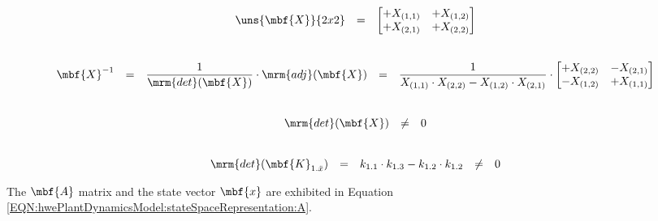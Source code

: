 \documentclass[crop=false,float=true,class=scrreprt]{standalone}
\begin{document}
\vspace*{+0em}


\begin{gather}
\label{EQN:hwePlantDynamicsModel:stateSpaceRepresentation:nonsingular:start}
\begin{array}{ccc}
\uns{
\begin{matrix}
\mbf{X}
\end{matrix}
}{2 x 2}
& = &
\begin{bmatrix}
+X_{(1,1)} & +X_{(1,2)} \\
+X_{(2,1)} & +X_{(2,2)} \\
\end{bmatrix}
\end{array}
\\[+2em]
\begin{array}{ccccccccccc}
\mbf{X}^{-1}
& = &
\displaystyle\frac{1}{\mrm{det}(\mbf{X})} \cdot \mrm{adj}(\mbf{X})
& = &
\displaystyle\frac{1}{X_{(1,1)} \cdot X_{(2,2)} - X_{(1,2)} \cdot X_{(2,1)}} 
\cdot
\begin{bmatrix}
+X_{(2,2)} & -X_{(2,1)} \\
-X_{(1,2)} & +X_{(1,1)} \\
\end{bmatrix}
\end{array}
\\[+2em]
\begin{array}{ccc}
\mrm{det}(\mbf{X})
& \neq &
0
\end{array}
\\[+2em]
\label{EQN:hwePlantDynamicsModel:stateSpaceRepresentation:nonsingular:end}
\begin{array}{ccccccc}
\mrm{det}(\mbf{K}_{1.\ddot{x}})
& =    &
k_{1.1} \cdot k_{1.3} - k_{1.2} \cdot k_{1.2}
& \neq &
0
\end{array}
\end{gather}









\clearpage




The $\mbf{A}$ matrix and the state vector $\mbf{x}$ are exhibited in Equation~%
\eqref{EQN:hwePlantDynamicsModel:stateSpaceRepresentation:A}.


\vspace{-2em}
\end{document}
